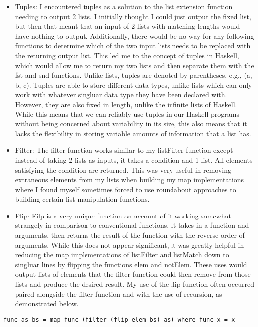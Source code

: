 \documentclass{article}
\theoremstyle{theorem}
\theoremstyle{definition}
\theoremstyle{remark}
\begin{document}
\begin{itemize}
\item {Tuples: I encountered tuples as a solution to the list extension function needing to output 2 lists. I initially thought I could just output the fixed list, but then that meant that an input of 2 lists with matching lengths would have nothing to output. Additionally, there would be no way for any following functions to determine which of the two input lists needs to be replaced with the returning output list. This led me to the concept of tuples in Haskell, which would allow me to return my two lists and then separate them with the fst and snd functions. Unlike lists, tuples are denoted by parentheses, e.g., (a, b, c). Tuples are able to store different data types, unlike lists which can only work with whatever singluar data type they have been declared with. However, they are also fixed in length, unlike the infinite lists of Haskell. While this means that we can reliably use tuples in our Haskell programs without being concerned about variability in its size, this also means that it lacks the flexibility in storing variable amounts of information that a list has.}
\item {Filter: The filter function works similar to my listFilter function except instead of taking 2 lists as inputs, it takes a condition and 1 list. All elements satisfying the condition are returned. This was very useful in removing extraneous elements from my lists when building my map implementations where I found myself sometimes forced to use roundabout approaches to building certain list manipulation functions.}
\item {Flip: Filp is a very unique function on account of it working somewhat strangely in comparison to conventional functions. It takes in a function and arguments, then returns the result of the function with the reverse order of arguments. While this does not appear significant, it was greatly helpful in reducing the map implementations of listFilter and listMatch down to singluar lines by flipping the functions elem and notElem. These uses would output lists of elements that the filter function could then remove from those lists and produce the desired result. My use of the flip function often occurred paired alongside the filter function and with the use of recursion, as demonstrated below.}
\end{itemize}
\begin{lstlisting}
func as bs = map func (filter (flip elem bs) as) where func x = x
\end{lstlisting}
\end{document}

